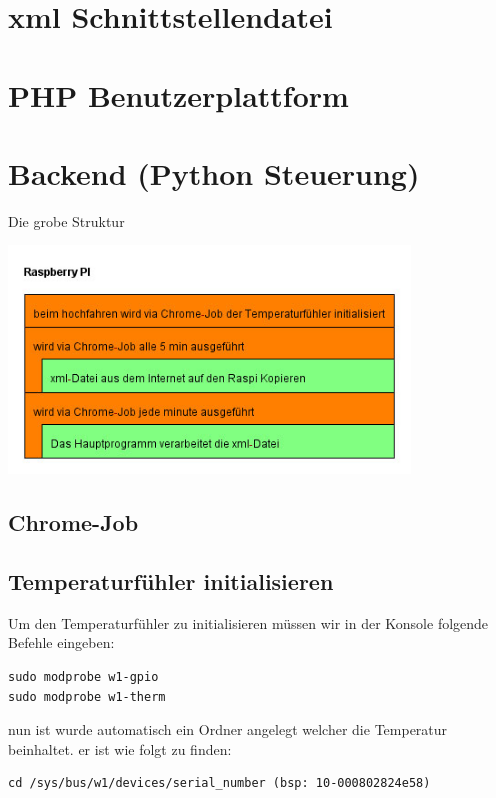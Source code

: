 \documentclass[4paper,0pt]{article}
\begin{document}
\section{xml Schnittstellendatei}
\section{PHP Benutzerplattform}
\section{Backend (Python Steuerung)}

Die grobe Struktur

\includegraphics[width=0.8\textwidth]{Bilder/RaspberryPI.jpg}

\subsection{Chrome-Job}
\subsection{Temperaturfühler initialisieren}

Um den Temperaturfühler zu initialisieren müssen wir in der Konsole folgende Befehle eingeben:

\begin{shaded}
\begin{lstlisting}
sudo modprobe w1-gpio
sudo modprobe w1-therm
\end{lstlisting}
\end{shaded}

nun ist wurde automatisch ein Ordner angelegt welcher die Temperatur beinhaltet. er ist wie folgt zu finden:

\begin{shaded}
\begin{lstlisting}
cd /sys/bus/w1/devices/serial_number (bsp: 10-000802824e58)
\end{lstlisting}
\end{shaded}
\end{document}
